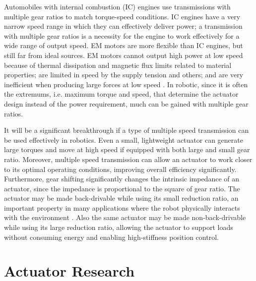 Automobiles with internal combustion (IC) engines use transmissions with multiple gear ratios to match torque-speed conditions. IC engines have a very narrow speed range in which they can effectively deliver power; a transmission with multiple gear ratios is a necessity for the engine to work effectively for a wide range of output speed. EM motors are more flexible than IC engines, but still far from ideal sources. EM motors cannot output high power at low speed because of thermal dissipation and magnetic flux limits related to material properties; are limited in speed by the supply tension and others; and are very inefficient when producing large forces at low speed \cite{hollerbach_comparative_1992}. In robotic, since it is often the extremums, i.e. maximum torque and speed, that determine the actuator design instead of the power requirement, much can be gained with multiple gear ratios.

It will be a significant breakthrough if a type of multiple speed transmission can be used effectively in robotics. Even a small, lightweight actuator can generate large torques and move at high speed if equipped with both large and small gear ratio. Moreover, multiple speed transmission can allow an actuator to work closer to its optimal operating conditions, improving overall efficiency significantly. Furthermore, gear shifting significantly changes the intrinsic impedance of an actuator, since the impedance is proportional to the square of gear ratio. The actuator may be made back-drivable while using its small reduction ratio, an important property in many applications where the robot physically interacts with the environment \cite{hogan_impedance_2004}. Also the same actuator may be made non-back-drivable while using its large reduction ratio, allowing the actuator to support loads without consuming energy and enabling high-stiffness position control.



\section{Actuator Research}
\label{sec:actres}

